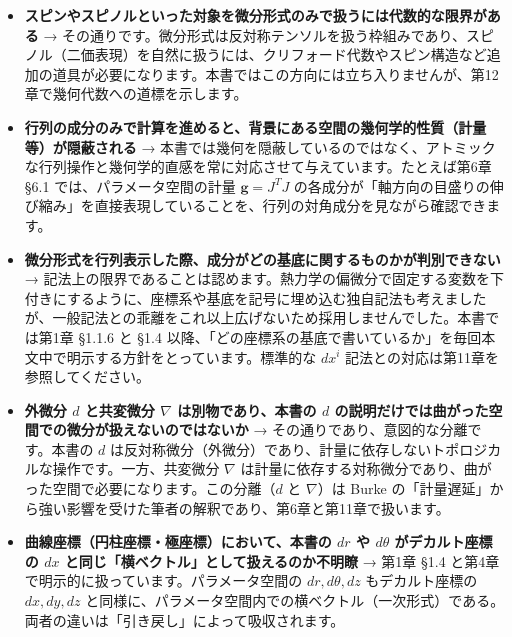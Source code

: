\documentclass[a4paper,12pt,openany]{book}
\begin{document}
\begin{itemize}
  →
  本書の射程外です。本書が扱うのは3次元デカルト空間（およびパラメータ空間）であり、接続は常に対称・計量
  compatible な Levi-Civita
  接続を暗黙に前提としています。一般の接続の理論は第11章で道標を示します。
\item
  \textbf{スピンやスピノルといった対象を微分形式のみで扱うには代数的な限界がある}
  →
  その通りです。微分形式は反対称テンソルを扱う枠組みであり、スピノル（二価表現）を自然に扱うには、クリフォード代数やスピン構造など追加の道具が必要になります。本書ではこの方向には立ち入りませんが、第12章で幾何代数への道標を示します。
\item
  \textbf{行列の成分のみで計算を進めると、背景にある空間の幾何学的性質（計量等）が隠蔽される}
  →
  本書では幾何を隠蔽しているのではなく、アトミックな行列操作と幾何学的直感を常に対応させて与えています。たとえば第6章
  §6.1 では、パラメータ空間の計量 \(\mathbf{g}=J^T J\)
  の各成分が「軸方向の目盛りの伸び縮み」を直接表現していることを、行列の対角成分を見ながら確認できます。
\item
  \textbf{微分形式を行列表示した際、成分がどの基底に関するものかが判別できない}
  →
  記法上の限界であることは認めます。熱力学の偏微分で固定する変数を下付きにするように、座標系や基底を記号に埋め込む独自記法も考えましたが、一般記法との乖離をこれ以上広げないため採用しませんでした。本書では第1章
  §1.1.6 と §1.4
  以降、「どの座標系の基底で書いているか」を毎回本文中で明示する方針をとっています。標準的な
  \(dx^i\) 記法との対応は第11章を参照してください。
\item
  \textbf{外微分 $d$ と共変微分 $\nabla$ は別物であり、本書の $d$ の説明だけでは曲がった空間での微分が扱えないのではないか}
  → その通りであり、意図的な分離です。本書の \(d\)
  は反対称微分（外微分）であり、計量に依存しないトポロジカルな操作です。一方、共変微分
  \(\nabla\)
  は計量に依存する対称微分であり、曲がった空間で必要になります。この分離（\(d\)
  と \(\nabla\)）は Burke
  の「計量遅延」から強い影響を受けた筆者の解釈であり、第6章と第11章で扱います。
\item
  \textbf{曲線座標（円柱座標・極座標）において、本書の $dr$ や $d\theta$ がデカルト座標の $dx$ と同じ「横ベクトル」として扱えるのか不明瞭}
  → 第1章 §1.4 と第4章で明示的に扱っています。パラメータ空間の
  \(dr,d\theta,dz\) もデカルト座標の \(dx,dy,dz\)
  と同様に、パラメータ空間内での横ベクトル（一次形式）である。両者の違いは「引き戻し」によって吸収されます。
\end{itemize}

\par\vspace{0.35em}\par
\end{document}
